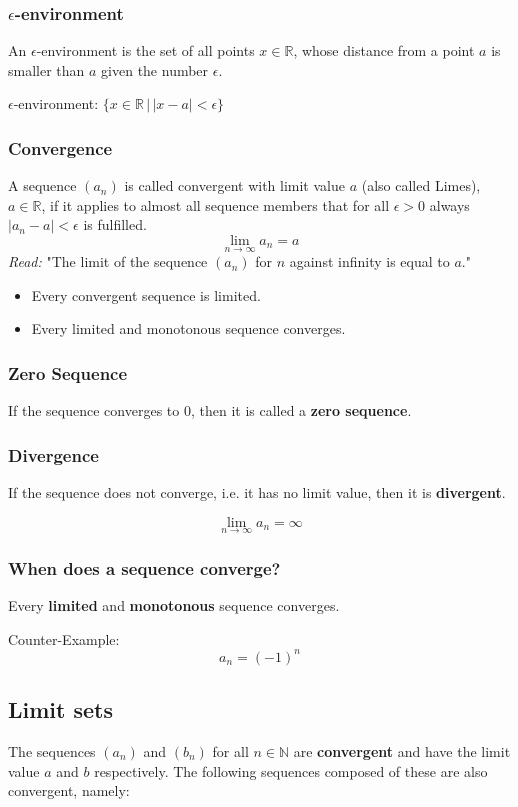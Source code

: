 \documentclass{book}
\begin{document}
\subsubsection{$\epsilon$-environment}
An $\epsilon$-environment is the set of all points $x \in \mathbb{R}$, whose distance from a point $a$ is smaller than $a$ given the number $\epsilon$.

$\epsilon$-environment: $\{x \in \mathbb{R}\,|\,|x-a| < \epsilon\}$

\subsubsection{Convergence}

A sequence $(a_{n})$ is called convergent with limit value $a$ (also called Limes), $a \in \mathbb{R}$, if it applies to almost all sequence members that for all $\epsilon > 0$ always $|a_{n} - a| < \epsilon$ is fulfilled.
\[
\lim\limits_{n\to \infty} a_{n} = a
\]
\textit{Read:} "The limit of the sequence $(a_{n})$ for $n$ against infinity is equal to $a$."
\begin{itemize}
\item Every convergent sequence is limited.
\item Every limited and monotonous sequence converges.
\end{itemize}
\subsubsection{Zero Sequence}
If the sequence converges to $0$, then it is called a \textbf{zero sequence}.

\subsubsection{Divergence}
If the sequence does not converge, i.e. it has no limit value, then it is \textbf{divergent}.

\[
\lim\limits_{n\to \infty} a_{n} = \infty
\]

\subsubsection{When does a sequence converge?}
Every \textbf{limited} and \textbf{monotonous} sequence converges.

Counter-Example:
\[
  a_n = (-1)^n
\]

\subsection{Limit sets}
The sequences $(a_n)$ and $(b_n)$ for all $n \in \mathbb{N}$ are \textbf{convergent} and have the limit value $a$ and $b$ respectively. The following sequences composed of these are also convergent, namely:
\end{document}
